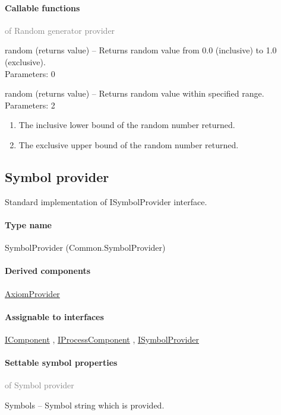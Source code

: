 	\paragraph{Callable functions}\textcolor{gray}{of Random generator provider}
	\begin{description*}
		\item[random]
		(returns value)
			-- Returns random value from 0.0 (inclusive) to 1.0 (exclusive).
		\\ Parameters: 0
		\item[random]
		(returns value)
			-- Returns random value within specified range.
		\\ Parameters: 2
			\begin{enumerate}
				\item The inclusive lower bound of the random number returned.
				\item             The exclusive upper bound of the random number returned.
			\end{enumerate}
	\end{description*}
	

\subsection{Symbol provider}
\label{Malsys.Processing.Components.Common.SymbolProvider}
Standard implementation of ISymbolProvider interface.\paragraph{Type name}
SymbolProvider (Common.SymbolProvider) 	\paragraph{Derived components}
		\hyperref[Malsys.Processing.Components.Common.AxiomProvider]{AxiomProvider}%
	\paragraph{Assignable to interfaces}
		\hyperref[Malsys.Processing.Components.IComponent]{IComponent}%
, 		\hyperref[Malsys.Processing.Components.IProcessComponent]{IProcessComponent}%
, 		\hyperref[Malsys.Processing.Components.ISymbolProvider]{ISymbolProvider}%
	\paragraph{Settable symbol properties}\textcolor{gray}{of Symbol provider}
	\begin{description*}
		\item[Symbols]
			-- Symbol string which is provided.
	\end{description*}
	
